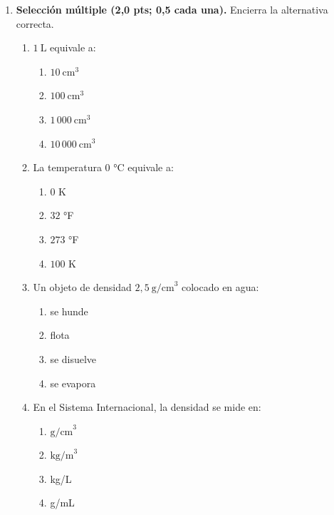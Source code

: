 \documentclass[12pt, letterpaper]{article}
\begin{document}
\begin{enumerate}[leftmargin=*, label=\textbf{\arabic*.}, itemsep=0.5em]

  \item \textbf{Selección múltiple (2,0 pts; 0,5 cada una).} Encierra la alternativa correcta.
        \begin{enumerate}[label=\alph*), leftmargin=1.8em, itemsep=0.25em]
          \item $1\ \text{L}$ equivale a:
                \begin{enumerate}[label=\Alph*), leftmargin=1.6em, itemsep=0pt, topsep=2pt]
                  \item $10\ \text{cm}^3$
                  \item $100\ \text{cm}^3$
                  \item $1\,000\ \text{cm}^3$
                  \item $10\,000\ \text{cm}^3$
                \end{enumerate}
          \item La temperatura $0$ °C equivale a:
                \begin{enumerate}[label=\Alph*), leftmargin=1.6em, itemsep=0pt, topsep=2pt]
                  \item $0$ K
                  \item $32$ °F
                  \item $273$ °F
                  \item $100$ K
                \end{enumerate}
          \item Un objeto de densidad $2{,}5\ \text{g/cm}^3$ colocado en agua:
                \begin{enumerate}[label=\Alph*), leftmargin=1.6em, itemsep=0pt, topsep=2pt]
                  \item se hunde
                  \item flota
                  \item se disuelve
                  \item se evapora
                \end{enumerate}
          \item En el Sistema Internacional, la densidad se mide en:
                \begin{enumerate}[label=\Alph*), leftmargin=1.6em, itemsep=0pt, topsep=2pt]
                  \item $\text{g/cm}^3$
                  \item $\text{kg/m}^3$
                  \item kg/L
                  \item g/mL
                \end{enumerate}
        \end{enumerate}


\end{enumerate}
\end{document}
